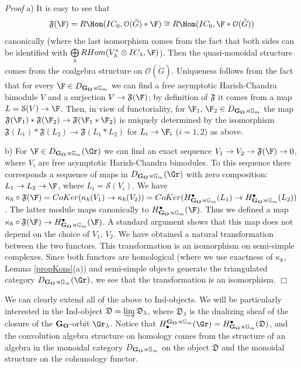 \documentclass[11pt]{amsart}
\theoremstyle{definition}
\theoremstyle{remark}
\renewcommand{\O}{{\mathcal O}}
\theoremstyle{remark}
\newcommand{\cal}{\mathcal}
\newcommand{\bu}{\bullet}
\newcommand{\<}{\langle}
\renewcommand{\>}{\rangle}
\newcommand{\oplusl}{\bigoplus\limits}
\newcommand{\LG}{{\check{G}}}
\renewcommand{\O}{{\cal O}}
\newcommand{\GO}{{\bf G_O}}
\newcommand{\Gm}{{{\mathbb G}_m}}
\renewcommand{\proof}{{\it Proof }}
\newcommand{\eqss}{{\mathcal{S}}}
\newcommand{\fufu}{{\mathfrak{F}}}
\newcommand{\qkap}{{\kappa_\hbar}}
\newcommand{\ds}{{\mathfrak D}}
\begin{document}
\proof a) 
It is easy to see that 
$$\fufu (\F)= R\Hom(IC_0, \O(\LG)* \F)\cong R\Hom(IC_0,
\F*\O(\LG))$$
canonically
(where the last isomorphism comes from the fact that
both sides can be identified with $\oplusl_\lambda 
RHom(V_\lambda^*\otimes IC_\lambda, \F)$). Then 
the quasi-monoidal structure comes from the coalgebra structure on 
$\O(\LG)$.
Uniqueness follows from the fact that for every $\F\in D_{\GO\rtimes \Gm}$
we can find a free asymptotic Harish-Chandra bimodule $V$ and a surjection
$V\to \fufu (\F)$; by definition of $\fufu$ it comes from a map
 $L=\eqss(V)\to \F$.
Then, in view of functoriality, for $\F_1,\,\F_2\in D_{\GO\rtimes \Gm}$
 the map $\fufu(\F_1)*\fufu(\F_2)\to
\fufu(\F_1*\F_2)$ is uniquely determined by the isomorphism
 $\fufu(L_1)*\fufu(L_2)
\to \fufu(L_1*L_2)$ for $L_i\to \F_i$ ($i=1,2$) as above.

b) For $\F\in D_{\GO\rtimes \Gm}(\Gr)$ we can find an exact sequence
$V_1\to V_2\to \fufu(\F)\to 0$, where $V_i$ are 
free asymptotic Harish-Chandra bimodules. 
To this sequence there corresponds a sequence
of maps in $D_{\GO\rtimes \Gm}(\Gr)$ with zero composition:
 $L_1\to L_2\to \F$, where $L_i=\eqss(V_i)$.
We have $\qkap\circ \fufu (\F) = CoKer (\qkap(V_1) \to \qkap(V_2))=CoKer
(H^\bullet_{\GO\rtimes \Gm}(L_1)\to 
H^\bullet_{\GO\rtimes \Gm}(L_2))$. The latter module
 maps canonically
to $H^\bullet_{\GO\rtimes \Gm}(\F)$. Thus we defined a map $\qkap \circ 
\fufu (\F)\to H^\bullet_{\GO\rtimes \Gm}
(\F)$. A standard argument shows that this map does not depend on the 
choice of $V_1,\, V_2$.
We have obtained a natural transformation between the two functors. This
 transformation is an isomorphism
on semi-simple complexes. Since both functors are homological (where
we use exactness of $\qkap$, Lemma \ref{propKons}(a)) and semi-simple objects generate the
 triangulated category
$D_{\GO\rtimes \Gm}(\Gr)$, we see that the transformation 
is an isomorphism. \hfill $\Box$


We can clearly extend all of the above to  Ind-objects.
We will be particularly interested in the Ind-object
$\ds=\varinjlim \ds_\lambda$, where $\ds_\lambda$ is the dualizing
sheaf of the closure of the $\GO$-orbit $\Gr_\lambda$.
Notice that $H_\bu^{\GO\rtimes \Gm}(\Gr)=H^\bu_{\GO\rtimes \Gm}(\ds)$,
 and the convolution algebra
structure on  homology comes from the structure of an algebra in the 
monoidal category $D_{\GO\rtimes \Gm}$ on the object $\ds$ and the monoidal
structure on the cohomology functor.%
\end{document}
